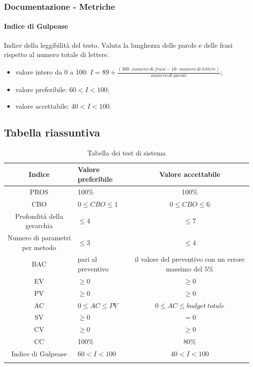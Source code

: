 		\subsubsection{Documentazione - Metriche}
		\paragraph{Indice di Gulpease}
		Indice della leggibilità del testo. Valuta la lunghezza delle parole e delle frasi rispetto al numero totale di lettere.
		\begin{itemize}
		\item valore intero da 0 a 100: $I = 89 + \frac{(300 \cdot numero \ di \ frasi - 10 \cdot numero \ di \ lettere)}{numero \ di \ parole}$;
		\item valore preferibile: $60 < I < 100$;
		\item valore accettabile: $40 < I < 100$.
		\end{itemize}
		
	\subsection{Tabella riassuntiva}
		\begin{center}
		\begin{longtable}{|c|p{10cm}|c|}
			\hline
			\rowcolor{lighter-grayer}
			\textbf{Indice} & \textbf{Valore preferibile} & \textbf{Valore accettabile}  \\ 
						
			\hline
			\endhead
			
			\hline
			PROS & 100\% & 100\% \\
			\hline
			CBO & $0 \leq CBO \leq 1$ & $0 \leq CBO \leq 6$ \\
			\hline
			Profondità della gerarchia & $\leq 4$ & $\leq 7$ \\
			\hline
			Numero di parametri per metodo & $\leq 3$ & $\leq 4$ \\
			\hline
			BAC & pari al preventivo & il valore del preventivo con un errore massimo del $5\%$ \\
			\hline
			EV & $\geq 0$ & $\geq 0$ \\
			\hline
			PV & $\geq 0$ & $\geq 0$ \\			
			\hline
			AC & $0 \leq AC \le PV$ & $0 \leq AC \leq budget \ totale$ \\			
			\hline
			SV & $\ge 0$ & $= 0$ \\			
			\hline
			CV & $\ge 0$ & $\geq 0$ \\		
			\hline
			CC & 100\% & 80\% \\
			\hline
			Indice di Gulpease & $60 < I < 100$ & $40 < I < 100$ \\
			\hline
				
			\hiderowcolors
			\caption{Tabella dei test di sistema}		
		\end{longtable}	
	\end{center}
	
